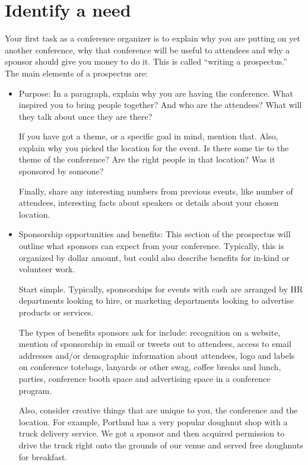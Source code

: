 \section*{Identify a need}

Your first task as a conference organizer is to explain why you are putting on yet another conference, why that conference will be useful to attendees and why a sponsor should give you money to do it. This is called ``writing a prospectus.''
The main elements of a prospectus are: 

\begin{itemize}
\item Purpose:
In a paragraph, explain why you are having the conference. What inspired you to bring people together? And who are the attendees? What will they talk about once they are there? 

If you have got a theme, or a specific goal in mind, mention that. Also, explain why you picked the location for the event. Is there some tie to the theme of the conference? Are the right people in that location? Was it sponsored by someone?

Finally, share any interesting numbers from previous events, like number of attendees, interesting facts about speakers or details about your chosen location. 

\item Sponsorship opportunities and benefits:
This section of the prospectus will outline what sponsors can expect from your conference. Typically, this is organized by dollar amount, but could also describe benefits for in-kind or volunteer work.

Start simple. Typically, sponsorships for events with cash are arranged by HR departments looking to hire, or marketing departments looking to advertise products or services. 

The types of benefits sponsors ask for include: recognition on a website, mention of sponsorship in email or tweets out to attendees, access to email addresses and/or demographic information about attendees, logo and labels on conference totebags, lanyards or other swag, coffee breaks and lunch, parties, conference booth space and advertising space in a conference program. 

Also, consider creative things that are unique to you, the conference and the location. For example, Portland has a very popular doughnut shop with a truck delivery service. We got a sponsor and then acquired permission to drive the truck right onto the grounds of our venue and served free doughnuts for breakfast.


\end{itemize}
